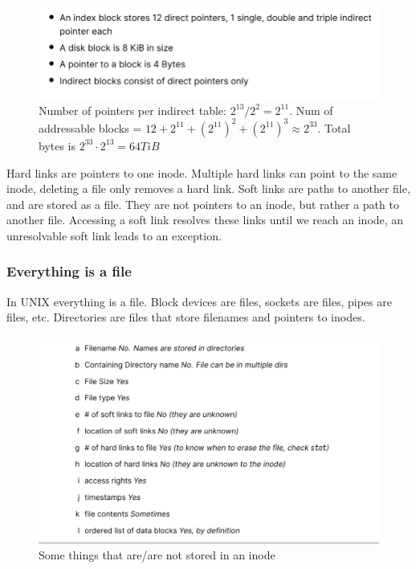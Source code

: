 \documentclass[../notes.tex]{subfiles}
\begin{document}
\begin{figure}[H]
    \centering
    \includegraphics[width=0.8\linewidth]{img/image_2023-03-16-17-49-55.png}
\caption{ Number of pointers per indirect table: $2^{13}/2^2 = 2^{11}$. Num of addressable blocks = $ 12 + 2^{11} + (2^{11}) ^2 + (2^{11}) ^3 \approx 2^{33} $. Total bytes is $ 2^{33} \cdot  2^{13} = 64 TiB $ }
\end{figure}


Hard links are pointers to one inode. Multiple hard links can point to the same inode, deleting a file only removes a hard link.
Soft links are paths to another file, and are stored as a file. They are not pointers to an inode, but rather a path to another file. Accessing a soft link resolves these links until we reach an inode, an unresolvable soft link leads to an exception.


\subsubsection{Everything is a file}

In UNIX everything is a file. Block devices are files, sockets are files, pipes are files, etc. Directories are files that store filenames and pointers to inodes. 


\begin{figure}[H]
    \centering
    \includegraphics[width=0.8\linewidth]{img/image_2023-03-16-17-59-51.png}
    \caption{Some things that are/are not stored in an inode}
\end{figure}
\end{document}
